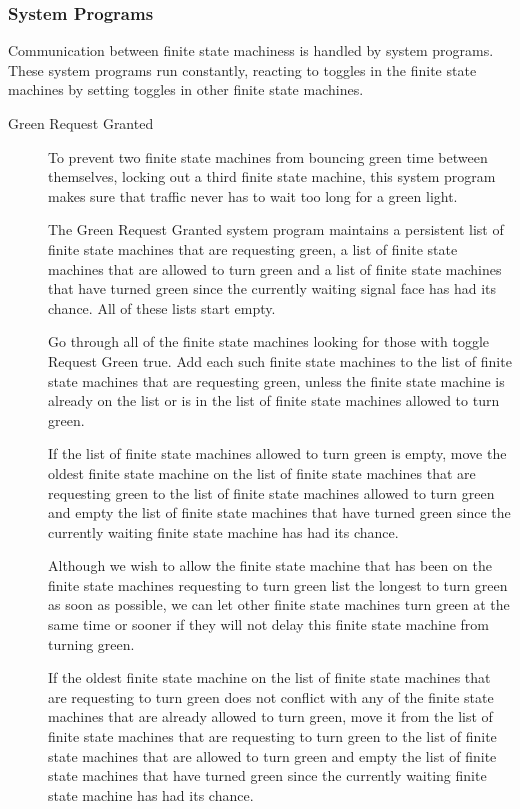 \documentclass[letterpaper,twoside]{article}
\begin{document}
\subsubsection{System Programs}

Communication between finite state machiness is handled by
system programs.
These system programs run constantly, reacting to toggles in the
finite state machines  by setting toggles in other finite state machines.

\begin{description}
\item [Green Request Granted]

  To prevent two finite state machines from bouncing green time between
  themselves, locking out a third finite state machine,
  this system program makes sure that
  traffic never has to wait too long for a green light.

  The Green Request Granted system program maintains a persistent list of
  finite state machines that are requesting green,
  a list of finite state machines that are allowed to turn green
  and a list of finite state machines that have turned green since the
  currently waiting signal face has had its chance.
  All of these lists start empty.

  Go through all of the finite state machines
  looking for those with toggle Request
  Green true.  Add each such finite state machines to the list of
  finite state machines that are requesting green,
  unless the finite state machine is already on
  the list or is in the list of finite state machines allowed to turn green.

  If the list of finite state machines allowed to turn green is empty, move the
  oldest finite state machine on the list of finite state machines
  that are requesting green to the list of finite state machines allowed to
  turn green and empty the list
  of finite state machines that have turned green since the currently waiting
  finite state machine has had its chance.

  Although we wish to allow the finite state machine that has been on the
  finite state machines requesting to turn green list the longest to turn green
  as soon as possible, we can let other finite state machines turn green
  at the same time or sooner if they will not delay this finite state machine
  from turning green.

  If the oldest finite state machine on the list of finite state machines
  that are requesting to turn green does not conflict with any of the
  finite state machines that are already allowed to turn green,
  move it from the list of finite state machines that are requesting
  to turn green to the list of finite state machines that are allowed
  to turn green and empty the list of finite state machines that have
  turned green since the currently waiting finite state machine has had
  its chance.


\end{description}
\end{document}
